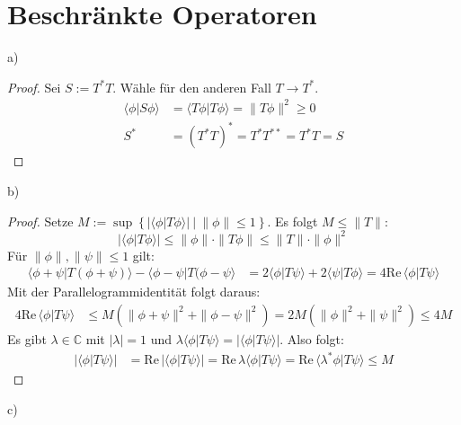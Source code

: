 \documentclass[a4paper,12pt]{article}
\newcommand{\brak}{}
\newcommand{\kla}{}
\newcommand{\klammer}{}
\begin{document}
\section{Beschränkte Operatoren}
a)
\begin{proof}
Sei $S:=T^\ast T$. Wähle für den anderen Fall $T\rightarrow T^\ast$. 
\begin{align*}
\brak\langle {\phi}| {S\phi}\rangle&=\brak\langle {T\phi}| {T\phi}\rangle=\|T\phi\|^2\ge 0 \\
S^\ast&=\kla\left( {T^\ast T} \right)^\ast=T^\ast T^{\ast\ast}=T^\ast T=S
\end{align*}
\end{proof}
b)
\begin{proof}
Setze $M:=\sup\klammer\left\{ {|\brak\langle {\phi}| {T\phi}\rangle| \ \vert\ \|\phi\|\le 1} \right\}$. Es folgt $M\le\|T\|$:
$$|\brak\langle {\phi}| {T\phi}\rangle| \le \|\phi\|\cdot\|T\phi\|\le\|T\|\cdot\|\phi\|^2$$ 
Für $\|\phi\|, \|\psi\|\le 1$ gilt:
\begin{align*}
\brak\langle {\phi+\psi}| {T(\phi+\psi)}\rangle-\brak\langle {\phi-\psi}| {T(\phi-\psi}\rangle&=2\brak\langle {\phi}| {T\psi}\rangle+2\brak\langle {\psi}| {T\phi}\rangle=4\mathrm{Re\,}\brak\langle {\phi}| {T\psi}\rangle
\end{align*}
Mit der Parallelogrammidentität folgt daraus:
\begin{align*}
4\mathrm{Re\,}\brak\langle {\phi}| {T\psi}\rangle &\le M\kla\left( {\|\phi+\psi\|^2+\|\phi-\psi\|^2} \right)=2M\kla\left( {\|\phi\|^2+\|\psi\|^2} \right)\le 4M
\end{align*}
Es gibt $\lambda\in\mathbb{C}$ mit $|\lambda|=1$ und $\lambda\brak\langle {\phi}| {T\psi}\rangle=|\brak\langle {\phi}| {T\psi}\rangle|$. Also folgt:
\begin{align*}
|\brak\langle {\phi}| {T\psi}\rangle|&=\mathrm{Re\,}|\brak\langle {\phi}| {T\psi}\rangle|=\mathrm{Re\,}\lambda\brak\langle {\phi}| {T\psi}\rangle=\mathrm{Re\,}\brak\langle {\lambda^\ast\phi}| {T\psi}\rangle\le M
\end{align*}
\end{proof}
c)
\end{document}
